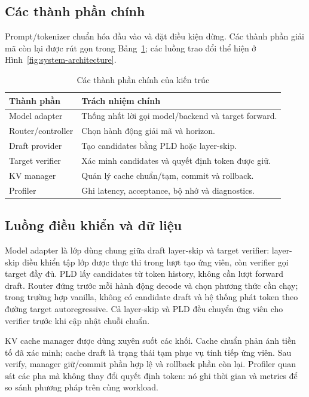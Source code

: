 \subsection{Các thành phần chính}
Prompt/tokenizer chuẩn hóa đầu vào và đặt điều kiện dừng. Các thành phần giải mã còn lại được rút gọn trong Bảng~\ref{tab:architecture-components}; các luồng trao đổi thể hiện ở Hình~\ref{fig:system-architecture}.
\begin{table}[H]
\centering
\caption{Các thành phần chính của kiến trúc}\label{tab:architecture-components}
\begin{tabularx}{0.92\textwidth}{@{}p{3.4cm}X@{}}
\toprule
\textbf{Thành phần} & \textbf{Trách nhiệm chính} \\
\midrule
Model adapter & Thống nhất lời gọi model/backend và target forward. \\
Router/controller & Chọn hành động giải mã và horizon. \\
Draft provider & Tạo candidates bằng PLD hoặc layer-skip. \\
Target verifier & Xác minh candidates và quyết định token được giữ. \\
KV manager & Quản lý cache chuẩn/tạm, commit và rollback. \\
Profiler & Ghi latency, acceptance, bộ nhớ và diagnostics. \\
\bottomrule
\end{tabularx}
\end{table}

\subsection{Luồng điều khiển và dữ liệu}
Model adapter là lớp dùng chung giữa draft layer-skip và target verifier: layer-skip điều khiển tập lớp được thực thi trong lượt tạo ứng viên, còn verifier gọi target đầy đủ. PLD lấy candidates từ token history, không cần lượt forward draft. Router đứng trước mỗi hành động decode và chọn phương thức cần chạy; trong trường hợp vanilla, không có candidate draft và hệ thống phát token theo đường target autoregressive. Cả layer-skip và PLD đều chuyển ứng viên cho verifier trước khi cập nhật chuỗi chuẩn.

KV cache manager được dùng xuyên suốt các khối. Cache chuẩn phản ánh tiền tố đã xác minh; cache draft là trạng thái tạm phục vụ tính tiếp ứng viên. Sau verify, manager giữ/commit phần hợp lệ và rollback phần còn lại. Profiler quan sát các pha mà không thay đổi quyết định token: nó ghi thời gian và metrics để so sánh phương pháp trên cùng workload.


